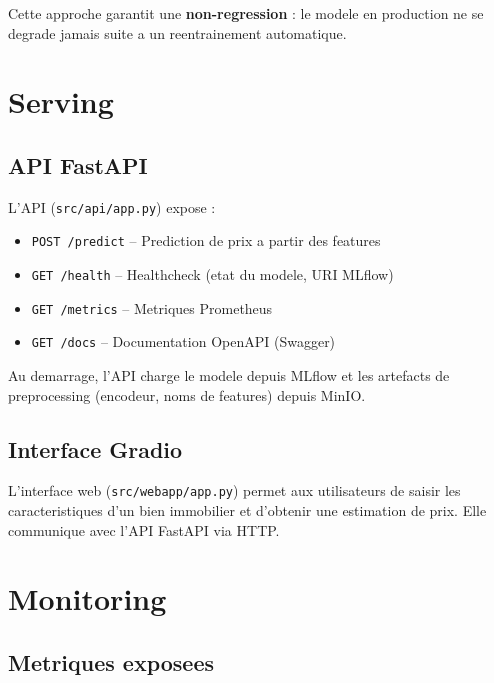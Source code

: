 \documentclass[a4paper,11pt]{article}
\begin{document}
Cette approche garantit une \textbf{non-regression} : le modele en production
ne se degrade jamais suite a un reentrainement automatique.

\section{Serving}

\subsection{API FastAPI}

L'API (\texttt{src/api/app.py}) expose :
\begin{itemize}
    \item \texttt{POST /predict} -- Prediction de prix a partir des features
    \item \texttt{GET /health} -- Healthcheck (etat du modele, URI MLflow)
    \item \texttt{GET /metrics} -- Metriques Prometheus
    \item \texttt{GET /docs} -- Documentation OpenAPI (Swagger)
\end{itemize}

Au demarrage, l'API charge le modele depuis MLflow et les artefacts de preprocessing
(encodeur, noms de features) depuis MinIO.

\subsection{Interface Gradio}

L'interface web (\texttt{src/webapp/app.py}) permet aux utilisateurs de saisir
les caracteristiques d'un bien immobilier et d'obtenir une estimation de prix.
Elle communique avec l'API FastAPI via HTTP.

\section{Monitoring}

\subsection{Metriques exposees}
\end{document}
